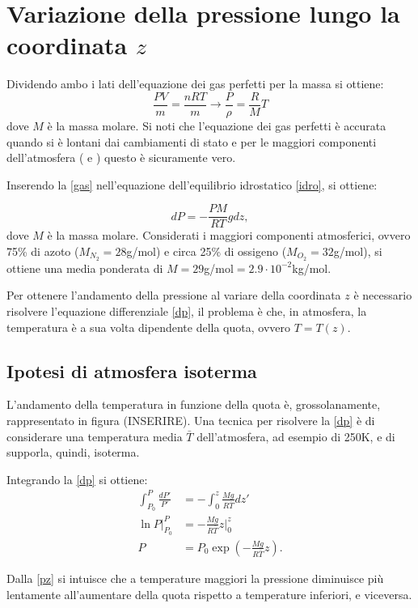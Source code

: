\section{Variazione della pressione lungo la coordinata $z$}
Dividendo ambo i lati dell'equazione dei gas perfetti per la massa si ottiene:
\begin{equation}\label{gas}
	\frac{PV}{m}=\frac{n RT}{m} \rightarrow \frac{P}{\rho}=\frac{R}{M}T
\end{equation}
dove $M$ è la massa molare. Si noti che l'equazione dei gas perfetti è accurata quando si è lontani dai cambiamenti di stato e per le maggiori componenti dell'atmosfera ( e ) questo è sicuramente vero. 

Inserendo la \eqref{gas} nell'equazione dell'equilibrio idrostatico \eqref{idro}, si ottiene:

\begin{equation}\label{dp}
	dP=-\frac{PM}{RT}g dz,
\end{equation}
dove $M$ è la massa molare. Considerati i maggiori componenti atmosferici, ovvero 75\% di azoto ($M_{N_2}=28$g/mol) e circa 25\% di ossigeno ($M_{O_2}=32$g/mol), si ottiene una media ponderata di $M=29$g/mol$=2.9\cdot10^{-2}$kg/mol.

Per ottenere l'andamento della pressione al variare della coordinata $z$ è necessario risolvere l'equazione differenziale \eqref{dp}, il problema è che, in atmosfera, la temperatura è a sua volta dipendente della quota, ovvero $T=T(z)$.\\


\subsection{Ipotesi di atmosfera isoterma}
L'andamento della temperatura in funzione della quota è, grossolanamente, rappresentato in figura (INSERIRE). Una tecnica per risolvere la \eqref{dp} è di considerare una temperatura media $\bar{T}$ dell'atmosfera, ad esempio di 250K, e di supporla, quindi, isoterma. 

Integrando la \eqref{dp} si ottiene: 
\begin{align}
	\int_{P_0}^{P}\frac{dP'}{P'}&=-\int_{0}^{z}\frac{Mg}{R\bar{T}}dz'\\
	\ln P \Big|_{P_0}^P&=-\frac{Mg}{R\bar{T}}z\Big|_0^z\\
	P&=P_0\exp\left(-\frac{Mg}{R\bar{T}}z\right) \label{pz}.
\end{align}

Dalla \eqref{pz} si intuisce che a temperature maggiori la pressione diminuisce più lentamente all'aumentare della quota rispetto a temperature inferiori, e viceversa.\\ %

